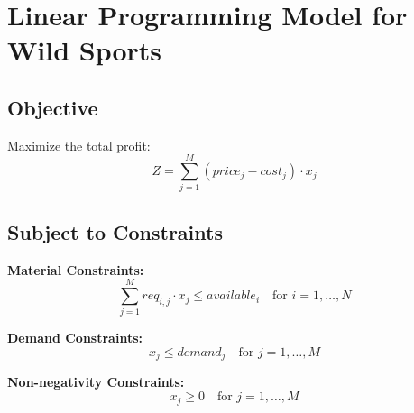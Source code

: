 \documentclass{article}
\begin{document}
\section*{Linear Programming Model for Wild Sports}

\subsection*{Objective}
Maximize the total profit:
\[
Z = \sum_{j=1}^{M} (price_j - cost_j) \cdot x_j
\]

\subsection*{Subject to Constraints}

\textbf{Material Constraints:}
\[
\sum_{j=1}^{M} req_{i,j} \cdot x_j \leq available_i \quad \text{for } i=1, \ldots, N
\]

\textbf{Demand Constraints:}
\[
x_j \leq demand_j \quad \text{for } j=1, \ldots, M
\]

\textbf{Non-negativity Constraints:}
\[
x_j \geq 0 \quad \text{for } j=1, \ldots, M
\]
\end{document}
